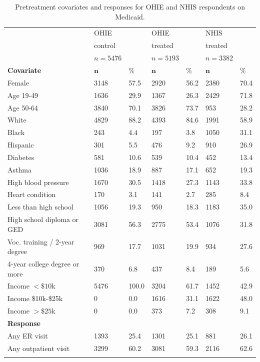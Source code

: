 \documentclass[12pt]{article}
\begin{document}
\begin{longtable}{lllllll}
  & OHIE &  & OHIE &  & NHIS &  \\ 
    & control &  & treated &  &treated &   \\ 
  & $n=5476$ &  & $n=5193$ &  & $n=3382$ &  \\  
  \hline   
    \hline   
 \textbf{Covariate} &  $\mathbf{n}$ & $\mathbf{\%}$ & $\mathbf{n}$ & $\mathbf{\%}$ & $\mathbf{n}$ & $\mathbf{\%}$ \\ 
\hline
Female & 3148 & 57.5 & 2920 & 56.2 & 2380 & 70.4 \\ 

Age 19-49 & 1636 & 29.9 & 1367 & 26.3 & 2429 & 71.8  \\ 

Age 50-64 & 3840 & 70.1 & 3826 & 73.7 & 953 & 28.2 \\ 

White & 4829 & 88.2 & 4393 & 84.6 & 1991 & 58.9  \\ 

Black & 243 & 4.4 & 197 & 3.8 & 1050 & 31.1  \\ 

Hispanic & 301 & 5.5 & 476 & 9.2 & 910 & 26.9  \\ 

Diabetes & 581 & 10.6 & 539 & 10.4 & 452 & 13.4 \\ 

Asthma & 1036 & 18.9 & 887 & 17.1 & 652 & 19.3  \\ 

High blood pressure & 1670 & 30.5 & 1418 & 27.3 & 1143 & 33.8  \\ 
  
Heart condition & 170 & 3.1 & 141 & 2.7 & 285 & 8.4 \\ 
  
Less than high school  & 1056 & 19.3 & 950 & 18.3 & 1183 & 35.0  \\ 
  
High school diploma or GED & 3081 & 56.3 & 2775 & 53.4 & 1076 & 31.8  \\ 

Voc. training / 2-year degree & 969 & 17.7 & 1031 & 19.9 & 934 & 27.6 \\ 

4-year college degree or more & 370 & 6.8 & 437 & 8.4 & 189 & 5.6 \\ 

Income $<\$10$k & 5476 & 100.0 & 3204 & 61.7 & 1452 & 42.9 \\

Income \$10k-\$25k & 0 & 0.0 & 1616 & 31.1 & 1622 & 48.0 \\

Income  $>\$25$k & 0 & 0.0 & 373 & 7.2 & 308 & 9.1 \\
   \hline
\hline
 \textbf{Response} &   &  &  & &  &  \\ 
Any ER visit &  1393 & 25.4 & 1301 & 25.1 & 881 & 26.1 \\ 
Any outpatient visit & 3299 & 60.2 & 3081 & 59.3 & 2116 & 62.6 \\ 
\hline
\hline
\caption{Pretreatment covariates and responses for OHIE and NHIS respondents on Medicaid.} 
\label{rct-nrt-compare}
\end{longtable}
\end{document}
